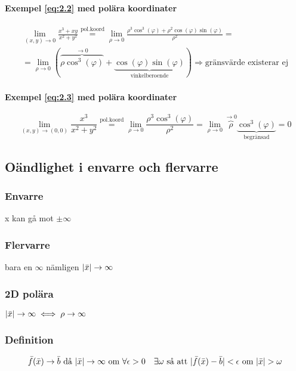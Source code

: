 \documentclass{article}
\DeclarePairedDelimiter \abs{\lvert}{\rvert}
\begin{document}
\paragraph{Exempel \eqref{eq:2.2} med polära koordinater}

\[
\begin{split}
\lim_{(x,y) \rightarrow 0} \frac{x^3+xy}{x^2+y^2} \overset{\mathrm{pol.koord}}{=} \lim_{\rho \rightarrow 0} \frac{\rho^3 \cos^3(\varphi) + \rho^2 \cos(\varphi) \sin(\varphi)}{\rho^2} = \\
=\lim_{\rho \rightarrow 0} (\overbrace{\rho \cos^3(\varphi)}^{\rightarrow 0}+\underbrace{\cos(\varphi) \sin(\varphi)}_\text{vinkelberoende}) \Rightarrow \text{gränsvärde existerar ej}
\end{split}
\]

\paragraph{Exempel \eqref{eq:2.3} med polära koordinater}

\[
	\lim_{(x,y) \rightarrow (0,0)} \frac{x^3}{x^2+y^2} \overset{\mathrm{pol.koord}}{=} \lim_{\rho \rightarrow 0} \frac{\rho^3\cos^3(\varphi)}{\rho^2} = 
	\lim_{\rho \rightarrow 0} \overbrace{\rho}^{\rightarrow 0}\underbrace{\cos^3(\varphi)}_\text{begränsad} = 0
\]

\subsection{Oändlighet i envarre och flervarre}
\subsubsection*{Envarre}
x kan gå mot $\pm\infty$
\subsubsection*{Flervarre}
bara en $\infty$ nämligen $\abs{\bar{x}} \rightarrow \infty$
\subsubsection*{2D polära}
$\abs{\bar{x}} \rightarrow \infty \iff \rho \rightarrow \infty$
\subsubsection{Definition}
\[
	\bar{f}(\bar{x}) \rightarrow \bar{b} \text{ då } \abs{\bar{x}} \rightarrow \infty \text{ om } \forall \epsilon > 0 \quad \exists \omega \text{ så att } \abs{\bar{f}(\bar{x}) - \bar{b}} < \epsilon \text{ om } \abs{\bar{x}} > \omega
\]
\end{document}
